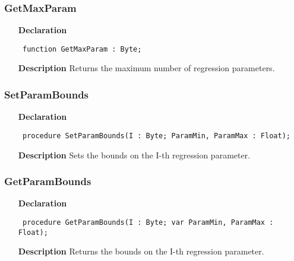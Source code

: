 \documentclass[12pt,a4paper,oneside]{report}
\newcommand{\declarationitem}[1]{\textbf{#1}}
\newcommand{\descriptiontitle}[1]{\textbf{#1}}
\newcommand{\code}[1]{\texttt{#1}}
\begin{document}
\subsubsection{GetMaxParam}
\label{unlfit-GetMaxParam}
\begin{itemize}\item[\declarationitem{Declaration}\hfill]
	\begin{flushleft}
		\code{
			function GetMaxParam : Byte;}
		
	\end{flushleft}
	
	\par
	\item[\descriptiontitle{Description}]
	Returns the maximum number of regression parameters.
	
\end{itemize}
\subsubsection{SetParamBounds}
\label{unlfit-SetParamBounds}
\begin{itemize}\item[\declarationitem{Declaration}\hfill]
	\begin{flushleft}
		\code{
			procedure SetParamBounds(I : Byte; ParamMin, ParamMax : Float);}
		
	\end{flushleft}
	
	\par
	\item[\descriptiontitle{Description}]
	Sets the bounds on the I{-}th regression parameter.
	
\end{itemize}
\subsubsection{GetParamBounds}
\label{unlfit-GetParamBounds}
\begin{itemize}\item[\declarationitem{Declaration}\hfill]
	\begin{flushleft}
		\code{
			procedure GetParamBounds(I : Byte; var ParamMin, ParamMax : Float);}
		
	\end{flushleft}
	
	\par
	\item[\descriptiontitle{Description}]
	Returns the bounds on the I{-}th regression parameter.
	
\end{itemize}
\end{document}
